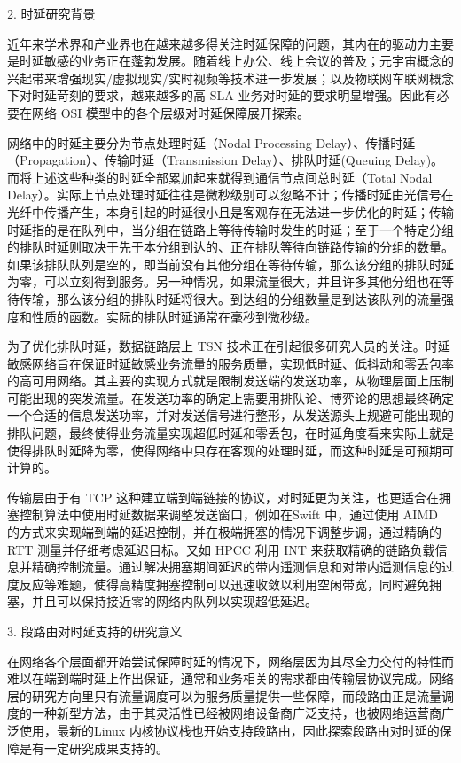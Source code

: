 2. 时延研究背景

近年来学术界和产业界也在越来越多得关注时延保障的问题，其内在的驱动力主要是时延敏感的业务正在蓬勃发展。随着线上办公、线上会议的普及；元宇宙概念的兴起带来增强现实/虚拟现实/实时视频等技术进一步发展；以及物联网车联网概念下对时延苛刻的要求，越来越多的高 \gls*{SLA} 业务对时延的要求明显增强。因此有必要在网络 \gls*{OSI} 模型中的各个层级对时延保障展开探索。

网络中的时延主要分为节点处理时延（Nodal Processing Delay）、传播时延（Propagation）、传输时延（Transmission Delay）、排队时延(Queuing Delay)。而将上述这些种类的时延全部累加起来就得到通信节点间总时延（Total Nodal Delay）。实际上节点处理时延往往是微秒级别可以忽略不计；传播时延由光信号在光纤中传播产生，本身引起的时延很小且是客观存在无法进一步优化的时延；传输时延指的是在队列中，当分组在链路上等待传输时发生的时延；至于一个特定分组的排队时延则取决于先于本分组到达的、正在排队等待向链路传输的分组的数量。如果该排队队列是空的，即当前没有其他分组在等待传输，那么该分组的排队时延为零，可以立刻得到服务。另一种情况，如果流量很大，并且许多其他分组也在等待传输，那么该分组的排队时延将很大。到达组的分组数量是到达该队列的流量强度和性质的函数。实际的排队时延通常在毫秒到微秒级。

为了优化排队时延，数据链路层上 \gls*{TSN} 技术正在引起很多研究人员的关注。时延敏感网络旨在保证时延敏感业务流量的服务质量，实现低时延、低抖动和零丢包率的高可用网络。其主要的实现方式就是限制发送端的发送功率，从物理层面上压制可能出现的突发流量。在发送功率的确定上需要用排队论、博弈论的思想最终确定一个合适的信息发送功率，并对发送信号进行整形，从发送源头上规避可能出现的排队问题，最终使得业务流量实现超低时延和零丢包，在时延角度看来实际上就是使得排队时延降为零，使得网络中只存在客观的处理时延，而这种时延是可预期可计算的。

传输层由于有 \gls*{TCP} 这种建立端到端链接的协议，对时延更为关注，也更适合在拥塞控制算法中使用时延数据来调整发送窗口，例如在Swift \cite{SWIFT} 中，通过使用 \gls*{AIMD} 的方式来实现端到端的延迟控制，并在极端拥塞的情况下调整步调，通过精确的 \gls*{RTT} 测量并仔细考虑延迟目标。又如 \gls*{HPCC} \cite{HPCC} 利用 \gls*{INT} 来获取精确的链路负载信息并精确控制流量。通过解决拥塞期间延迟的带内遥测信息和对带内遥测信息的过度反应等难题，使得高精度拥塞控制可以迅速收敛以利用空闲带宽，同时避免拥塞，并且可以保持接近零的网络内队列以实现超低延迟。

3. 段路由对时延支持的研究意义

在网络各个层面都开始尝试保障时延的情况下，网络层因为其尽全力交付的特性而难以在端到端时延上作出保证，通常和业务相关的需求都由传输层协议完成。网络层的研究方向里只有流量调度可以为服务质量提供一些保障，而段路由正是流量调度的一种新型方法，由于其灵活性已经被网络设备商广泛支持，也被网络运营商广泛使用，最新的Linux \cite{LINUXSRv6} 内核协议栈也开始支持段路由，因此探索段路由对时延的保障是有一定研究成果支持的。

